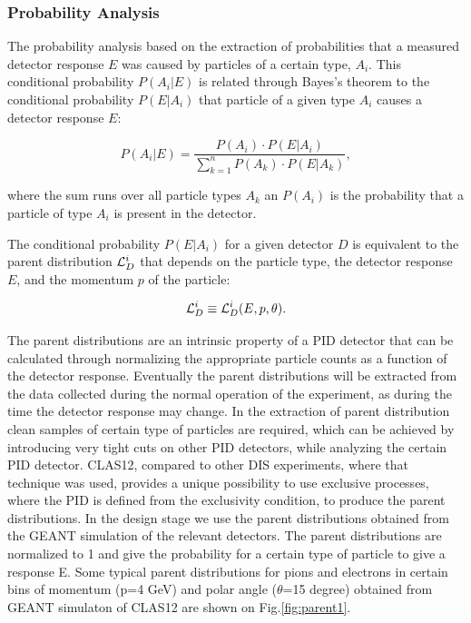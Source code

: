 \subsubsection{Probability Analysis}

The probability analysis  based on the extraction of probabilities that 
a measured detector response $E$ was caused by particles of a certain type, $A_i$. This 
conditional probability $P(A_i|E)$ is related through Bayes's theorem to the conditional 
probability  $P(E|A_i)$ that particle of a given type $A_i$ causes a detector response $E$:

\begin{equation}
P(A_i|E)= \frac{P(A_i)\cdot P(E|A_i)}{\sum_{k=1}^n P(A_k)\cdot P(E|A_k)},
\end{equation}

where the sum runs over all particle types $A_k$ an $P(A_i)$ is the probability that 
a particle of type $A_i$ is present in the detector.

The conditional probability $P(E|A_i)$ for a given detector $D$ is equivalent to the 
parent distribution ${\cal L}_D^i$ that depends on the particle type, the detector 
response $E$, and the momentum $p$ of the particle:

\begin{equation}
{\cal L}_D^i \equiv {\cal L}_D^i(E,p,\theta).
\end{equation}

The parent distributions are an intrinsic property of a PID detector
that can be calculated through normalizing the appropriate particle counts as a 
function of the detector response. Eventually the parent distributions will be extracted
from the data collected during the normal operation of the experiment, 
as during the time the detector response may change. 
In the extraction of parent distribution clean samples of certain type of particles
are required, which can be achieved by introducing very tight cuts on other PID detectors,
while analyzing the certain PID detector. CLAS12, compared to other DIS experiments, where
that technique was used, provides a unique possibility to use exclusive processes, where
the PID is defined from the exclusivity condition, to produce the parent distributions.
In the design stage 
we use the parent distributions obtained from the GEANT simulation of the relevant detectors.
The parent distributions are normalized to 1 and give the probability for a certain
type of particle to give a response E. Some typical parent distributions 
for pions and electrons in certain
bins of momentum (p=4 GeV) and polar angle ($\theta$=15 degree)  obtained from GEANT
simulaton of CLAS12 \cite{HTCC,PCAL} are shown on 
Fig.\ref{fig:parent1}. 


